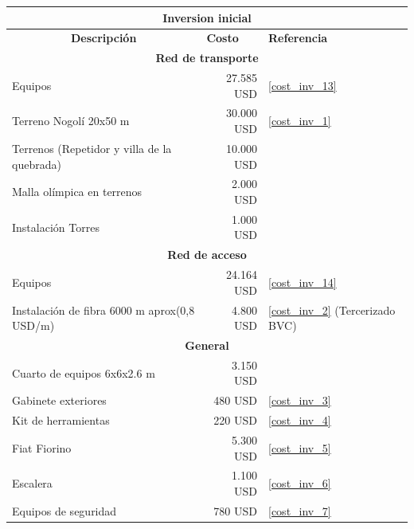 \documentclass[12pt,a4paper]{book}
\begin{document}
\begin{table}[H]
  \centering
    \begin{tabular}{|l|l|l|}
    \hline
    \multicolumn{3}{|c|}{\textbf{Inversion inicial}} \\
    \hline
    \multicolumn{1}{|c|}{\textbf{Descripción}} & \textbf{Costo} & \textbf{Referencia} \\
    \hline
    \multicolumn{3}{|c|}{\textbf{Red de transporte}} \\
    \hline
    Equipos & \multicolumn{1}{r|}{             27.585 USD } & \ref{cost_inv_13} \\
    \hline
    Terreno  Nogolí 20x50 m  & \multicolumn{1}{r|}{             30.000 USD } & \ref{cost_inv_1} \\
    \hline
    Terrenos (Repetidor y villa de la quebrada) & \multicolumn{1}{r|}{             10.000 USD } &  \\
    \hline
    Malla olímpica en terrenos & \multicolumn{1}{r|}{               2.000 USD } &  \\
    \hline
    Instalación Torres & \multicolumn{1}{r|}{               1.000 USD } &  \\
    \hline
    \multicolumn{3}{|c|}{\textbf{Red de acceso}} \\
    \hline
    Equipos & \multicolumn{1}{r|}{             24.164 USD } & \ref{cost_inv_14} \\
    \hline
    Instalación de fibra  6000 m aprox(0,8 USD/m) & \multicolumn{1}{r|}{               4.800 USD } & \ref{cost_inv_2} (Tercerizado BVC)  \\
    \hline
    \multicolumn{3}{|c|}{\textbf{General}} \\
    \hline
    Cuarto de equipos 6x6x2.6 m & \multicolumn{1}{r|}{               3.150 USD } &  \\
    \hline
    Gabinete exteriores & \multicolumn{1}{r|}{                  480 USD } & \ref{cost_inv_3} \\
    \hline
    Kit de herramientas & \multicolumn{1}{r|}{                  220 USD } & \ref{cost_inv_4} \\
    \hline
    Fiat Fiorino & \multicolumn{1}{r|}{               5.300 USD } & \ref{cost_inv_5} \\
    \hline
    Escalera & \multicolumn{1}{r|}{               1.100 USD } & \ref{cost_inv_6} \\
    \hline
    Equipos de seguridad & \multicolumn{1}{r|}{                  780 USD } & \ref{cost_inv_7} \\

\end{tabular}
\end{table}
\end{document}
